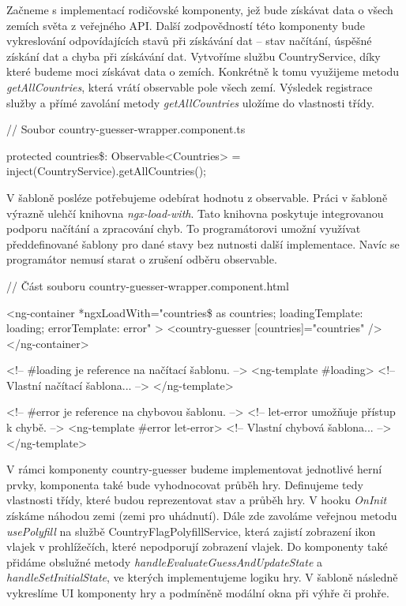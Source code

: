 Začneme s implementací rodičovské komponenty, jež bude získávat data o všech zemích světa z veřejného API. 
Další zodpovědností této komponenty bude vykreslování odpovídajících stavů při získávání dat -- stav načítání, úspěšné získání dat a chyba při získávání dat. 
Vytvoříme službu CountryService, díky které budeme moci získávat data o zemích. Konkrétně k tomu využijeme metodu \emph{getAllCountries}, která vrátí observable pole všech zemí. 
Výsledek registrace služby a přímé zavolání metody \emph{getAllCountries} uložíme do vlastnosti třídy.

\begin{prog}
// Soubor country-guesser-wrapper.component.ts

protected countries\$: Observable<Countries> 
  = inject(CountryService).getAllCountries();
\end{prog}

V šabloně posléze potřebujeme odebírat hodnotu z observable. Práci v šabloně výrazně ulehčí knihovna \emph{ngx-load-with}. 
Tato knihovna poskytuje integrovanou podporu načítání a zpracování chyb. To programátorovi umožní využívat předdefinované šablony pro dané stavy bez nutnosti další implementace. 
Navíc se programátor nemusí starat o zrušení odběru observable.

\begin{prog}
// Část souboru country-guesser-wrapper.component.html

<ng-container
  *ngxLoadWith="countries\$ as countries; 
  loadingTemplate: loading; errorTemplate: error"
>
  <country-guesser [countries]="countries" />
</ng-container>

<!-- \#loading je reference na načítací šablonu. -->
<ng-template \#loading>
  <!-- Vlastní načítací šablona... -->
</ng-template>

<!-- \#error je reference na chybovou šablonu. -->
<!-- let-error umožňuje přístup k chybě. -->
<ng-template \#error let-error>
  <!-- Vlastní chybová šablona... -->
</ng-template>
\end{prog}

V rámci komponenty country-guesser budeme implementovat jednotlivé herní prvky, komponenta také bude vyhodnocovat průběh hry. 
Definujeme tedy vlastnosti třídy, které budou reprezentovat stav a průběh hry. V hooku \emph{OnInit} získáme náhodou zemi (zemi pro uhádnutí). 
Dále zde zavoláme veřejnou metodu \emph{usePolyfill} na službě CountryFlagPolyfillService, která zajistí zobrazení ikon vlajek v prohlížečích, které nepodporují zobrazení vlajek.
Do komponenty také přidáme obslužné metody \emph{handleEvaluateGuessAndUpdateState} a \emph{handleSetInitialState}, ve kterých implementujeme logiku hry. 
V šabloně následně vykreslíme UI komponenty hry a podmíněně modální okna při výhře či prohře.

